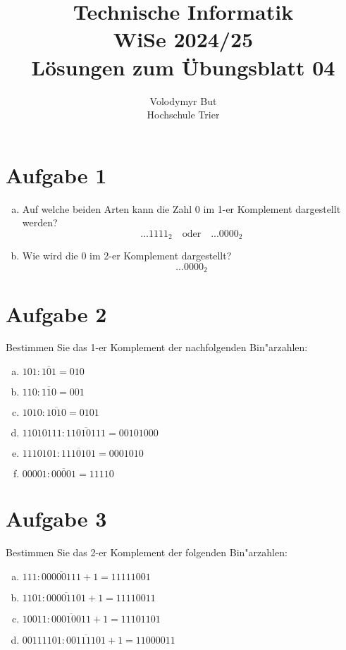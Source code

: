 \documentclass[10pt, oneside]{article}
\title{Technische Informatik\\[10pt]\Large{WiSe 2024/25}\\[15pt]\Large{L{\"o}sungen zum {\"U}bungsblatt 04}}
\author{Volodymyr But\\[10pt]Hochschule Trier}
\date{}
\begin{document}
\sloppy

\maketitle
\vspace{25px}

\section{Aufgabe 1}

\begin{enumerate}[(a)]
    \item Auf welche beiden Arten kann die Zahl 0 im 1-er Komplement dargestellt werden?
        \begin{equation*}
            ...1111_{2} \quad\text{oder}\quad ...0000_{2}
        \end{equation*}
    \item Wie wird die 0 im 2-er Komplement dargestellt?
        \begin{equation*}
            ...0000_{2}
        \end{equation*}
\end{enumerate}

\section{Aufgabe 2}

Bestimmen Sie das 1-er Komplement der nachfolgenden Bin"arzahlen:
\begin{enumerate}[(a)]
    \item $101 : \overline{101} = 010$
    \item $110 : \overline{110} = 001$
    \item $1010 : \overline{1010} = 0101$
    \item $11010111 : \overline{11010111} = 00101000$
    \item $1110101 : \overline{1110101} = 0001010$
    \item $00001 : \overline{00001} = 11110$
\end{enumerate}

\section{Aufgabe 3}

Bestimmen Sie das 2-er Komplement der folgenden Bin"arzahlen:
\begin{enumerate}[(a)]
    \item $111 : \overline{00000111} + 1 = 11111001$
    \item $1101 : \overline{00001101} + 1 = 11110011$
    \item $10011 : \overline{00010011} + 1 = 11101101$
    \item $00111101 : \overline{00111101} + 1 = 11000011$
\end{enumerate}
\end{document}
